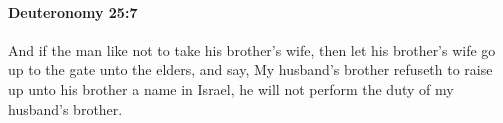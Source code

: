 
		\paragraph{Deuteronomy 25:7} %
			\label{DEUTERONOMY-25-7}

			And if the man like not to take his brother's wife, then let his brother's wife go up to the gate unto the elders, and say, My husband's brother refuseth to raise up unto his brother a name in Israel, he will not perform the duty of my husband's brother.


